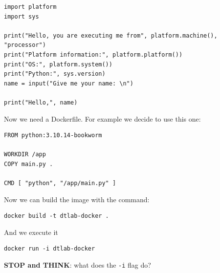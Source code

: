 \documentclass[11pt,a4paper]{article}
\begin{document}
\begin{verbatim}
import platform
import sys

print("Hello, you are executing me from", platform.machine(), "processor")
print("Platform information:", platform.platform())
print("OS:", platform.system())
print("Python:", sys.version)
name = input("Give me your name: \n")

print("Hello,", name)
\end{verbatim}

Now we need a Dockerfile. For example we decide to use this one:

\begin{verbatim}
FROM python:3.10.14-bookworm

WORKDIR /app
COPY main.py .

CMD [ "python", "/app/main.py" ]
\end{verbatim}

Now we can build the image with the command:

\begin{verbatim}
docker build -t dtlab-docker .
\end{verbatim}

And we execute it

\begin{verbatim}
docker run -i dtlab-docker
\end{verbatim}

\textbf{STOP and THINK}: what does the \texttt{-i} flag do?
\end{document}

